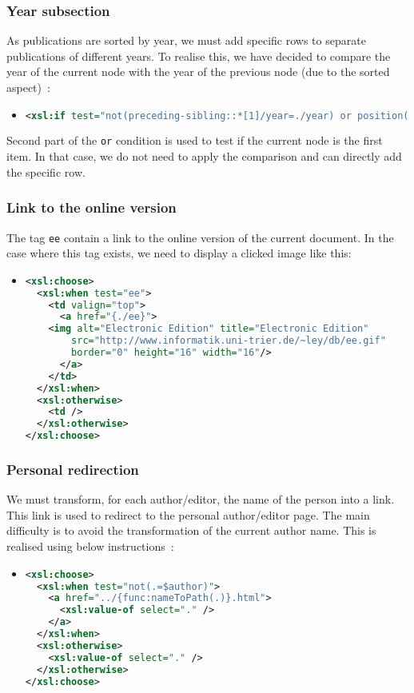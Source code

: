 \documentclass{article}
\begin{document}
    \subsubsection{Year subsection}
      As publications are sorted by year, we must add specific rows to separate publications of different years. To realise this, we have decided to compare the year of the current node with the year of the previous node (due to the sorted aspect)~:
      \begin{itemize}
	\item \begin{lstlisting}[language=XML]
<xsl:if test="not(preceding-sibling::*[1]/year=./year) or position()=1">\end{lstlisting}
      \end{itemize}
      Second part of the \verb|or| condition is used to test if the current node is the first item. In that case, we do not need to apply the comparison and can directly add the specific row.
      
    \subsubsection{Link to the online version}
      The tag \verb|ee| contain a link to the online version of the current document.  In the case where this tag exists, we need to display a clicked image like this:
      \begin{itemize}
	\item \begin{lstlisting}[language=XML]
<xsl:choose>
  <xsl:when test="ee">
    <td valign="top">
      <a href="{./ee}">
	<img alt="Electronic Edition" title="Electronic Edition"
	    src="http://www.informatik.uni-trier.de/~ley/db/ee.gif"
	    border="0" height="16" width="16"/>
      </a>
    </td>
  </xsl:when>
  <xsl:otherwise>
    <td />
  </xsl:otherwise>
</xsl:choose>\end{lstlisting}
      \end{itemize}
      
    \subsubsection{Personal redirection}
      We must transform, for each author/editor, the name of the person into a link. This link is used to redirect to the personal author/editor page. The main difficulty is to avoid the transformation of the current author name. This is realised using below instructions~:
      \begin{itemize}
	\item \begin{lstlisting}[language=XML]
<xsl:choose>
  <xsl:when test="not(.=$author)">
    <a href="../{func:nameToPath(.)}.html">
      <xsl:value-of select="." />
    </a>
  </xsl:when>
  <xsl:otherwise>
    <xsl:value-of select="." />
  </xsl:otherwise>
</xsl:choose>\end{lstlisting}
      \end{itemize}
      
\end{document}
